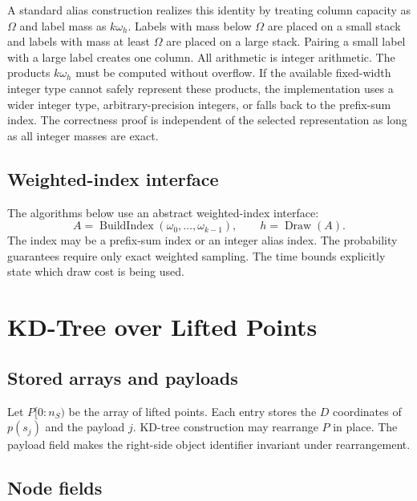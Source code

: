 \documentclass[11pt]{article}
\theoremstyle{definition}
\theoremstyle{plain}
\theoremstyle{remark}
\DeclareMathOperator{\BuildIndex}{BuildIndex}
\DeclareMathOperator{\Draw}{Draw}
\begin{document}
A standard alias construction realizes this identity by treating column capacity as
$\Omega$ and label mass as $k\omega_h$.  Labels with mass below $\Omega$ are placed on a
small stack and labels with mass at least $\Omega$ are placed on a large stack.  Pairing a
small label with a large label creates one column.  All arithmetic is integer arithmetic.
The products $k\omega_h$ must be computed without overflow.  If the available fixed-width
integer type cannot safely represent these products, the implementation uses a wider integer
type, arbitrary-precision integers, or falls back to the prefix-sum index.  The correctness
proof is independent of the selected representation as long as all integer masses are exact.

\subsection{Weighted-index interface}

The algorithms below use an abstract weighted-index interface:
\[
  A = \BuildIndex(\omega_0,\ldots,\omega_{k-1}),
  \qquad
  h = \Draw(A).
\]
The index may be a prefix-sum index or an integer alias index.  The probability guarantees
require only exact weighted sampling.  The time bounds explicitly state which draw cost is
being used.

\section{KD-Tree over Lifted Points}

\subsection{Stored arrays and payloads}

Let $P[0:n_S)$ be the array of lifted points.  Each entry stores the $D$ coordinates of
$p(s_j)$ and the payload $j$.  KD-tree construction may rearrange $P$ in place.  The payload
field makes the right-side object identifier invariant under rearrangement.

\subsection{Node fields}
\end{document}
